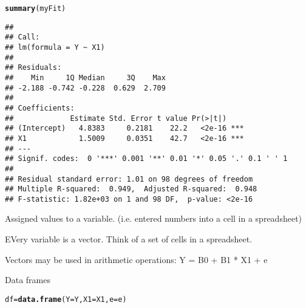 \documentclass[xcolor=dvipsnames]{beamer}
\makeatletter
\newcommand{\hlstd}[1]{\textcolor[rgb]{0.345,0.345,0.345}{#1}}%
\newcommand{\hlkwb}[1]{\textcolor[rgb]{0.69,0.353,0.396}{#1}}%
\newcommand{\hlkwc}[1]{\textcolor[rgb]{0.333,0.667,0.333}{#1}}%
\newcommand{\hlkwd}[1]{\textcolor[rgb]{0.737,0.353,0.396}{\textbf{#1}}}%
\newenvironment{kframe}{%
 \def\at@end@of@kframe{}%
 \ifinner\ifhmode%
  \def\at@end@of@kframe{\end{minipage}}%
  \begin{minipage}{\columnwidth}%
 \fi\fi%
 \def\FrameCommand##1{\hskip\@totalleftmargin \hskip-\fboxsep
 \colorbox{shadecolor}{##1}\hskip-\fboxsep
     \hskip-\linewidth \hskip-\@totalleftmargin \hskip\columnwidth}%
 \MakeFramed {\advance\hsize-\width
   \@totalleftmargin\z@ \linewidth\hsize
   \@setminipage}}%
 {\par\unskip\endMakeFramed%
 \at@end@of@kframe}
\newenvironment{knitrout}{}{} %
\makeatother
\begin{document}
\begin{frame}[fragile]
\begin{knitrout}\tiny
{}\color{fgcolor}\begin{kframe}
\begin{alltt}
\hlkwd{summary}\hlstd{(myFit)}
\end{alltt}
\begin{verbatim}
## 
## Call:
## lm(formula = Y ~ X1)
## 
## Residuals:
##    Min     1Q Median     3Q    Max 
## -2.188 -0.742 -0.228  0.629  2.709 
## 
## Coefficients:
##             Estimate Std. Error t value Pr(>|t|)    
## (Intercept)   4.8383     0.2181    22.2   <2e-16 ***
## X1            1.5009     0.0351    42.7   <2e-16 ***
## ---
## Signif. codes:  0 '***' 0.001 '**' 0.01 '*' 0.05 '.' 0.1 ' ' 1
## 
## Residual standard error: 1.01 on 98 degrees of freedom
## Multiple R-squared:  0.949,	Adjusted R-squared:  0.948 
## F-statistic: 1.82e+03 on 1 and 98 DF,  p-value: <2e-16
\end{verbatim}
\end{kframe}
\end{knitrout}

\end{frame}

\begin{frame}
Assigned values to a variable. (i.e. entered numbers into a cell in a spreadsheet)

EVery variable is a vector. Think of a set of cells in a spreadsheet.

Vectors may be used in arithmetic operations:
Y = B0 + B1 * X1 + e
\end{frame}

\begin{frame}[fragile]{Data frames}
\begin{knitrout}
\color{fgcolor}\begin{kframe}
\begin{alltt}
\hlstd{df} \hlkwb{=} \hlkwd{data.frame}\hlstd{(}\hlkwc{Y} \hlstd{= Y,} \hlkwc{X1} \hlstd{= X1,} \hlkwc{e} \hlstd{= e)}
\end{alltt}
\end{kframe}
\end{knitrout}

\end{frame}
\end{document}
